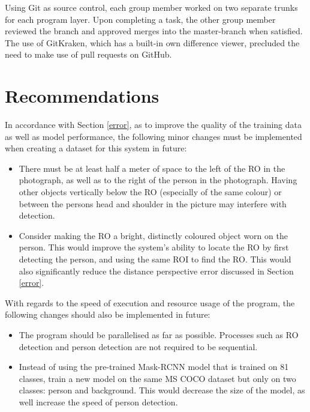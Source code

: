 \documentclass[conference]{IEEEtran}
\begin{document}
Using Git as source control, each group member worked on two separate trunks for each program layer.
Upon completing a task, the other group member reviewed the branch and approved merges into the master-branch when satisfied.
The use of GitKraken, which has a built-in own difference viewer, precluded the need to make use of pull requests on GitHub.

\section{Recommendations}
In accordance with Section \ref{error}, as to improve the quality of the training data as well as model performance, the following minor changes must be implemented when creating a dataset for this system in future:
\begin{itemize}
	\item There must be at least half a meter of space to the left of the RO in the photograph, as well as to the right of the person in the photograph.
	Having other objects vertically below the RO (especially of the same colour) or between the persons head and shoulder in the picture may interfere with detection.
	\item Consider making the RO a bright, distinctly coloured object worn on the person.
	This would improve the system's ability to locate the RO by first detecting the person, and using the same ROI to find the RO.
	This would also significantly reduce the distance perspective error discussed in Section \ref{error}.
\end{itemize}
With regards to the speed of execution and resource usage of the program, the following changes should also be implemented in future:
\begin{itemize}
	\item The program should be parallelised as far as possible.
	Processes such as RO detection and person detection are not required to be sequential.
	\item Instead of using the pre-trained Mask-RCNN model that is trained on 81 classes, train a new model on the same MS COCO dataset but only on two classes: person and background.
	This would decrease the size of the model, as well increase the speed of person detection.
\end{itemize}
\end{document}
